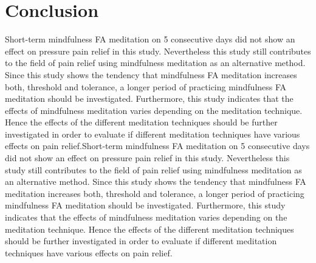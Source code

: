 \section{Conclusion}
Short-term mindfulness FA meditation on 5 consecutive days did not show an effect on pressure pain relief in this study. Nevertheless this study still contributes to the field of pain relief using mindfulness meditation as an alternative method. Since this study shows the tendency that mindfulness FA meditation increases both, threshold and tolerance, a longer period of practicing mindfulness FA meditation should be investigated. Furthermore, this study indicates that the effects of mindfulness meditation varies depending on the meditation technique. Hence the effects of the different meditation techniques should be further investigated in order to evaluate if different meditation techniques have various effects on pain relief.Short-term mindfulness FA meditation on 5 consecutive days did not show an effect on pressure pain relief in this study. Nevertheless this study still contributes to the field of pain relief using mindfulness meditation as an alternative method. Since this study shows the tendency that mindfulness FA meditation increases both, threshold and tolerance, a longer period of practicing mindfulness FA meditation should be investigated. Furthermore, this study indicates that the effects of mindfulness meditation varies depending on the meditation technique. Hence the effects of the different meditation techniques should be further investigated in order to evaluate if different meditation techniques have various effects on pain relief.
